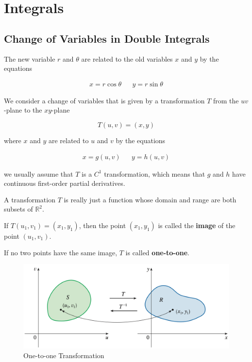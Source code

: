 \chapter{Integrals}

\section{Change of Variables in Double Integrals}

The new variable $r$ and $\theta$ are related to the old variables $x$ and $y$ by the equations

\begin{align}
    x = r\cos \theta && y = r\sin \theta
\end{align}

We consider a change of variables that is given by a transformation $T$ from the $uv$-plane to the $xy$-plane

\begin{equation}
    T(u, v) = (x, y)
\end{equation}

where $x$ and $y$ are related to $u$ and $v$ by the equations

\begin{align}
    x = g(u, v) && y = h(u, v)
\end{align}

we usually assume that $T$ is a $C^1$ transformation, which means that $g$ and $h$ have continuous first-order partial derivatives.

A transformation $T$ is really just a function whose domain and range are both subsets of $\mathbb{R}^2$.

If $T(u_1, v_1)=(x_1, y_1)$, then the point $(x_1, y_1)$ is called the \textbf{image} of the point $(u_1, v_1)$.

If no two points have the same image, $T$ is called \textbf{one-to-one}.

\begin{figure}
    \centering
    \includegraphics[scale=0.3]{appendices/figures/fig008.png}
    \caption{One-to-one Transformation}
\end{figure}

